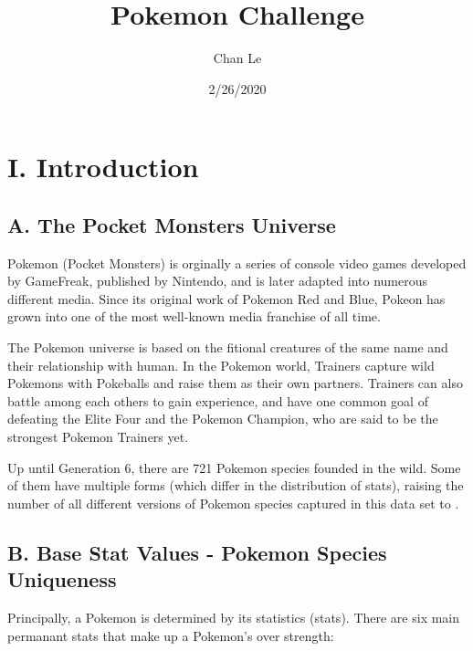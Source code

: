 \documentclass[]{article}
\title{Pokemon Challenge}
\author{Chan Le}
\date{2/26/2020}
\begin{document}
\maketitle

\hypertarget{i.-introduction}{%
\section{\texorpdfstring{\textbf{I.
Introduction}}{I. Introduction}}\label{i.-introduction}}

\hypertarget{a.-the-pocket-monsters-universe}{%
\subsection{\texorpdfstring{\textbf{A. The Pocket Monsters
Universe}}{A. The Pocket Monsters Universe}}\label{a.-the-pocket-monsters-universe}}

Pokemon (Pocket Monsters) is orginally a series of console video games
developed by GameFreak, published by Nintendo, and is later adapted into
numerous different media. Since its original work of Pokemon Red and
Blue, Pokeon has grown into one of the most well-known media franchise
of all time.

The Pokemon universe is based on the fitional creatures of the same name
and their relationship with human. In the Pokemon world, Trainers
capture wild Pokemons with Pokeballs and raise them as their own
partners. Trainers can also battle among each others to gain experience,
and have one common goal of defeating the Elite Four and the Pokemon
Champion, who are said to be the strongest Pokemon Trainers yet.

Up until Generation 6, there are 721 Pokemon species founded in the
wild. Some of them have multiple forms (which differ in the distribution
of stats), raising the number of all different versions of Pokemon
species captured in this data set to .

\hypertarget{b.-base-stat-values---pokemon-species-uniqueness}{%
\subsection{\texorpdfstring{\textbf{B. Base Stat Values - Pokemon
Species
Uniqueness}}{B. Base Stat Values - Pokemon Species Uniqueness}}\label{b.-base-stat-values---pokemon-species-uniqueness}}

Principally, a Pokemon is determined by its statistics (stats). There
are six main permanant stats that make up a Pokemon's over strength:
\end{document}
